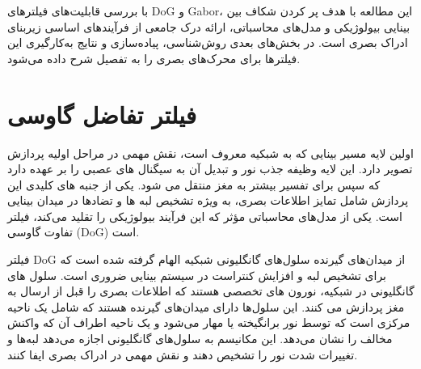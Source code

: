         با بررسی قابلیت‌های فیلترهای 
        DoG و Gabor، 
        این مطالعه با هدف پر کردن شکاف بین بینایی بیولوژیکی و مدل‌های محاسباتی، ارائه درک جامعی از فرآیندهای اساسی زیربنای ادراک بصری است. در بخش‌های بعدی روش‌شناسی، پیاده‌سازی و نتایج به‌کارگیری این فیلترها برای محرک‌های بصری را به تفصیل شرح داده می‌شود.
    \section{فیلتر تفاضل گاوسی}
    اولین لایه مسیر بینایی که به شبکیه معروف است، نقش مهمی در مراحل اولیه پردازش تصویر دارد. این لایه وظیفه جذب نور و تبدیل آن به سیگنال های عصبی را بر عهده دارد که سپس برای تفسیر بیشتر به مغز منتقل می شود. یکی از جنبه های کلیدی این پردازش شامل تمایز اطلاعات بصری، به ویژه تشخیص لبه ها و تضادها در میدان بینایی است. یکی از مدل‌های محاسباتی مؤثر که این فرآیند بیولوژیکی را تقلید می‌کند، فیلتر تفاوت گاوسی 
    (DoG) 
    است.

    فیلتر 
    DoG 
    از میدان‌های گیرنده سلول‌های گانگلیونی شبکیه الهام گرفته شده است که برای تشخیص لبه و افزایش کنتراست در سیستم بینایی ضروری است. سلول های گانگلیونی در شبکیه، نورون های تخصصی هستند که اطلاعات بصری را قبل از ارسال به مغز پردازش می کنند. این سلول‌ها دارای میدان‌های گیرنده هستند که شامل یک ناحیه مرکزی است که توسط نور برانگیخته یا مهار می‌شود و یک ناحیه اطراف آن که واکنش مخالف را نشان می‌دهد. این مکانیسم به سلول‌های گانگلیونی اجازه می‌دهد لبه‌ها و تغییرات شدت نور را تشخیص دهند و نقش مهمی در ادراک بصری ایفا کنند.

